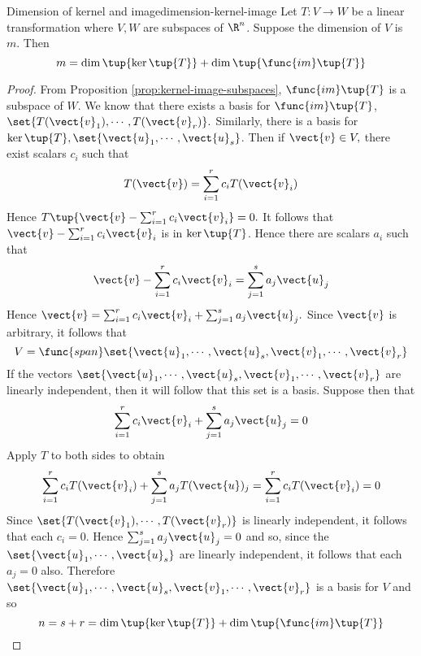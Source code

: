 \begin{theorem}{Dimension of kernel and image}{dimension-kernel-image}
Let $T:V\rightarrow W$ be a linear transformation where $V,W$ are subspaces of $\R^n$. Suppose the dimension of $V$ is $m$. Then 
\[
m=\dim \tup{\ker \tup{T} } +\dim \tup{\func{im}\tup{
T} } 
\]
\end{theorem}

\begin{proof}
From Proposition \ref{prop:kernel-image-subspaces}, $\func{im}\tup{T} $ is a subspace of $W.$ We know that there exists a basis for $\func{im}\tup{T}$, $\set{T(\vect{v}
_{1}),\cdots ,T(\vect{v}_{r})} . $ Similarly, there is a basis for $\ker
\tup{T} ,\set{\vect{u}_{1},\cdots ,\vect{u}_{s}} $. Then if $
\vect{v}\in V,$ there exist scalars $c_{i}$ such that 
\begin{equation*}
T(\vect{v})=\sum_{i=1}^{r}c_{i}T(\vect{v}_{i})
\end{equation*}
Hence $T\tup{\vect{v}-\sum_{i=1}^{r}c_{i}\vect{v}_{i}} =0.$ It follows
that $\vect{v}-\sum_{i=1}^{r}c_{i}\vect{v}_{i}$ is in $\ker \tup{T} $.
Hence there are scalars $a_{i}$ such that 
\begin{equation*}
\vect{v}-\sum_{i=1}^{r}c_{i}\vect{v}_{i}=\sum_{j=1}^{s}a_{j}\vect{u}_{j}
\end{equation*}
Hence $\vect{v}=\sum_{i=1}^{r}c_{i}\vect{v}_{i}+\sum_{j=1}^{s}a_{j}\vect{u}
_{j}. $ Since $\vect{v}$ is arbitrary, it follows that 
\begin{equation*}
V=\func{span}\set{\vect{u}_{1},\cdots ,\vect{u}_{s},\vect{v}_{1},\cdots ,
\vect{v}_{r}}
\end{equation*}
If the vectors $\set{\vect{u}_{1},\cdots ,\vect{u}_{s},\vect{v}_{1},\cdots ,
\vect{v}_{r}} $ are linearly independent, then it will follow that
this set is a basis. Suppose then that 
\begin{equation*}
\sum_{i=1}^{r}c_{i}\vect{v}_{i}+\sum_{j=1}^{s}a_{j}\vect{u}_{j}=0
\end{equation*}
Apply $T$ to both sides to obtain 
\begin{equation*}
\sum_{i=1}^{r}c_{i}T(\vect{v}_{i})+\sum_{j=1}^{s}a_{j}T(\vect{u})
_{j}=\sum_{i=1}^{r}c_{i}T(\vect{v}_{i})=0
\end{equation*}
Since $\set{T(\vect{v}_{1}),\cdots ,T(\vect{v}_{r})} $ is linearly
independent, it follows that each $c_{i}=0.$ Hence $\sum_{j=1}^{s}a_{j}\vect{u
}_{j}=0$ and so, since the $\set{\vect{u}_{1},\cdots ,\vect{u}_{s}} $
are linearly independent, it follows that each $a_{j}=0$ also. Therefore $\set{\vect{u}_{1},\cdots ,\vect{u}_{s},\vect{v}_{1},\cdots ,\vect{v}
_{r}} $ is a basis for $V$ and so 
\begin{equation*}
n=s+r=\dim \tup{\ker \tup{T} } +\dim \tup{\func{im}\tup{
T} } 
\end{equation*}
\end{proof}

